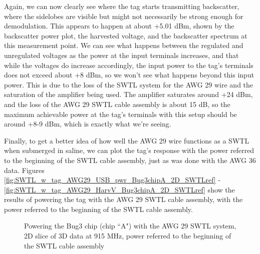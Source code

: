 \documentclass[12pt,onecolumn,titlepage]{article}
\begin{document}
Again, we can now clearly see where the tag starts transmitting backscatter, where the sidelobes are visible but might not necessarily be strong enough for demodulation. This appears to happen at about +5.01 dBm, shown by the backscatter power plot, the harvested voltage, and the backscatter spectrum at this measurement point. We can see what happens between the regulated and unregulated voltages as the power at the input terminals increases, and that while the voltages do increase accordingly, the input power to the tag's terminals does not exceed about +8 dBm, so we won't see what happens beyond this input power. This is due to the loss of the SWTL system for the AWG 29 wire and the saturation of the amplifier being used. The amplifier saturates around +24 dBm, and the loss of the AWG 29 SWTL cable assembly is about 15 dB, so the maximum achievable power at the tag's terminals with this setup should be around +8-9 dBm, which is exactly what we're seeing.

Finally, to get a better idea of how well the AWG 29 wire functions as a SWTL when submerged in saline, we can plot the tag's response with the power referred to the beginning of the SWTL cable assembly, just as was done with the AWG 36 data. Figures \ref{fig:SWTL_w_tag_AWG29_USB_pwr_Bug3chipA_2D_SWTLref} - \ref{fig:SWTL_w_tag_AWG29_HarvV_Bug3chipA_2D_SWTLref} show the results of powering the tag with the AWG 29 SWTL cable assembly, with the power referred to the beginning of the SWTL cable assembly. 



\begin{figure}[htbp]
	\centering
		\quad
	\label{fig:SWTL_w_tag_AWG29_2D_SWTLref}
	\caption{Powering the Bug3 chip (chip ``A") with the AWG 29 SWTL system, 2D slice of 3D data at 915 MHz, power referred to the beginning of the SWTL cable assembly }
\end{figure}
\end{document}
